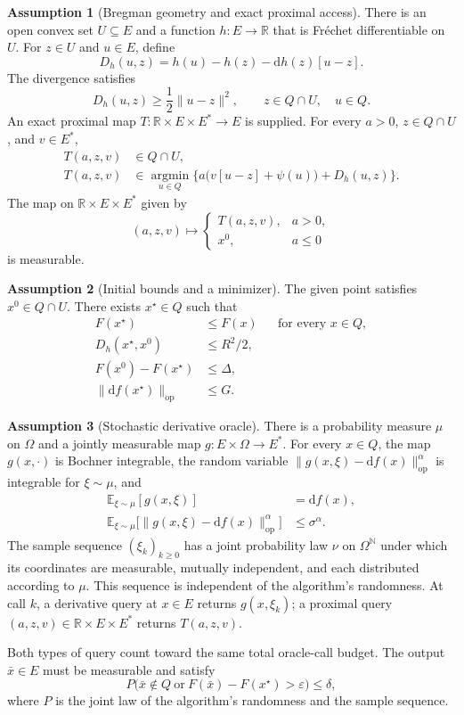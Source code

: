 \documentclass[10pt]{article}
\theoremstyle{definition}
\newtheorem{assumption}{Assumption}
\begin{document}
\begin{assumption}[Bregman geometry and exact proximal access]
There is an open convex set $U\subseteq E$ and a function $h:E\to\mathbb{R}$ that is Fr\'echet differentiable on $U$. For $z\in U$ and $u\in E$, define
\[
D_h(u,z)=h(u)-h(z)-\mathrm{d}h(z)[u-z].
\]
The divergence satisfies
\[
D_h(u,z)\geq\frac12\|u-z\|^2,
\qquad z\in Q\cap U,\quad u\in Q.
\]
An exact proximal map $T:\mathbb{R}\times E\times E^*\to E$ is supplied. For every $a>0$, $z\in Q\cap U$, and $v\in E^*$,
\[
\begin{aligned}
T(a,z,v)&\in Q\cap U,\\
T(a,z,v)&\in\underset{u\in Q}{\operatorname{argmin}}
\bigl\{a\bigl(v[u-z]+\psi(u)\bigr)+D_h(u,z)\bigr\}.
\end{aligned}
\]
The map on $\mathbb{R}\times E\times E^*$ given by
\[
(a,z,v)\longmapsto
\begin{cases}
T(a,z,v),&a>0,\\
x^0,&a\leq0
\end{cases}
\]
is measurable.
\end{assumption}

\begin{assumption}[Initial bounds and a minimizer]
The given point satisfies $x^0\in Q\cap U$. There exists $x^\star\in Q$ such that
\[
\begin{aligned}
F(x^\star)&\leq F(x) &&\text{for every }x\in Q,\\
D_h(x^\star,x^0)&\leq R^2/2,\\
F(x^0)-F(x^\star)&\leq\Delta,\\
\|\mathrm{d}f(x^\star)\|_{\mathrm{op}}&\leq G.
\end{aligned}
\]
\end{assumption}

\begin{assumption}[Stochastic derivative oracle]
There is a probability measure $\mu$ on $\Omega$ and a jointly measurable map $g:E\times\Omega\to E^*$. For every $x\in Q$, the map $g(x,\cdot)$ is Bochner integrable, the random variable $\|g(x,\xi)-\mathrm{d}f(x)\|_{\mathrm{op}}^\alpha$ is integrable for $\xi\sim\mu$, and
\[
\begin{aligned}
\mathbb{E}_{\xi\sim\mu}[g(x,\xi)]&=\mathrm{d}f(x),\\
\mathbb{E}_{\xi\sim\mu}
\bigl[\|g(x,\xi)-\mathrm{d}f(x)\|_{\mathrm{op}}^\alpha\bigr]
&\leq\sigma^\alpha.
\end{aligned}
\]
The sample sequence $(\xi_k)_{k\geq0}$ has a joint probability law $\nu$ on $\Omega^{\mathbb{N}}$ under which its coordinates are measurable, mutually independent, and each distributed according to $\mu$. This sequence is independent of the algorithm's randomness. At call $k$, a derivative query at $x\in E$ returns $g(x,\xi_k)$; a proximal query $(a,z,v)\in\mathbb{R}\times E\times E^*$ returns $T(a,z,v)$.
\end{assumption}

Both types of query count toward the same total oracle-call budget. The output $\bar{x}\in E$ must be measurable and satisfy
\[
P\bigl(\bar{x}\notin Q\ \text{or}\ F(\bar{x})-F(x^\star)>\varepsilon\bigr)
\leq\delta,
\]
where $P$ is the joint law of the algorithm's randomness and the sample sequence.
\end{document}

